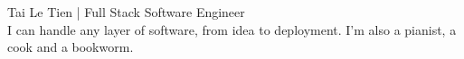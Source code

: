 {\Huge Tai Le Tien} | Full Stack Software Engineer\\
\vspace{8pt}
I can handle any layer of software, from idea to deployment. I'm also a pianist,
a cook and a bookworm.
